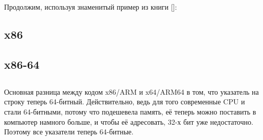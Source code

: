 \section{\HelloWorldSectionName}
\label{sec:helloworld}

Продолжим, используя знаменитый пример из книги [\KRBook]:



\subsection{x86}





\subsection{x86-64}








\subsection{\Conclusion{}}

Основная разница между кодом x86/ARM и x64/ARM64 в том, что указатель на строку теперь 64-битный.
Действительно, ведь для того современные \ac{CPU} и стали 64-битными, потому что подешевела память,
её теперь можно поставить в компьютер намного больше, и чтобы её адресовать, 32-х бит уже
недостаточно.
Поэтому все указатели теперь 64-битные.



